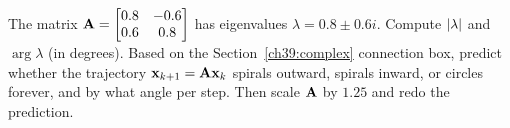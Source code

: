 \begin{exercise}
\label{ch39:ex12}
The matrix $\mathbf{A} = \begin{bmatrix} 0.8 & -0.6\\ 0.6 & 0.8\end{bmatrix}$ has eigenvalues $\lambda =
0.8 \pm 0.6 i$. Compute $\lvert\lambda\rvert$ and $\arg\lambda$ (in degrees). Based on the
Section~\ref{ch39:complex} connection box, predict whether the trajectory $\mathbf{x}_{k+1} =
\mathbf{A}\mathbf{x}_k$ spirals outward, spirals inward, or circles forever, and by what angle per step.
Then scale $\mathbf{A}$ by $1.25$ and redo the prediction.
\end{exercise}
